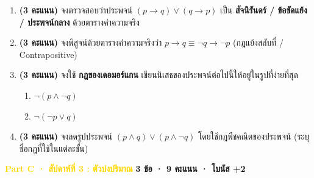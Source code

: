 \documentclass[a4paper,14pt]{article}
\begin{document}
\begin{enumerate}[label=\textbf{B\arabic*.},leftmargin=2.2em,itemsep=8pt]
  \item \textbf{(3 คะแนน)} จงตรวจสอบว่าประพจน์ $(p \rightarrow q) \lor (q \rightarrow p)$ เป็น
        \textbf{สัจนิรันดร์ / ข้อขัดแย้ง / ประพจน์กลาง} ด้วยตารางค่าความจริง
        \vspace{4.5em}

  \item \textbf{(3 คะแนน)} จงพิสูจน์ด้วยตารางค่าความจริงว่า $p \rightarrow q \equiv \neg q \rightarrow \neg p$
        (กฎแย้งสลับที่ / Contrapositive)
        \vspace{4.5em}

  \item \textbf{(3 คะแนน)} จงใช้ \textbf{กฎของเดอมอร์แกน} เขียนนิเสธของประพจน์ต่อไปนี้ให้อยู่ในรูปที่ง่ายที่สุด
        \begin{enumerate}[label=\arabic*),leftmargin=1.5em,itemsep=1pt,topsep=2pt]
          \item $\neg(p \land \neg q)$
          \item $\neg(\neg p \lor q)$
        \end{enumerate}
        \vspace{2em}

  \item \textbf{(3 คะแนน)} จงลดรูปประพจน์ $(p \land q) \lor (p \land \neg q)$ โดยใช้กฎพีชคณิตของประพจน์
        (ระบุชื่อกฎที่ใช้ในแต่ละขั้น)
        \vspace{3em}
\end{enumerate}

\newpage

\begin{tcolorbox}[colback=lyellow,colframe=gold,arc=3mm,boxrule=0.5pt,
  left=10pt,right=10pt,top=5pt,bottom=5pt]
\textbf{\textcolor{gold}{Part C · สัปดาห์ที่ 3 : ตัวบ่งปริมาณ}} \hfill \textbf{3 ข้อ · 9 คะแนน · โบนัส +2}
\end{tcolorbox}
\end{document}
